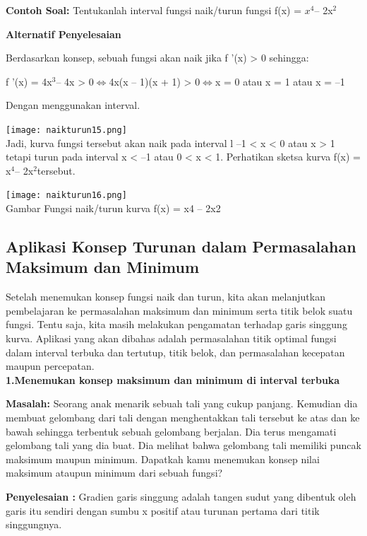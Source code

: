 \documentclass[11pt,fleqn]{book} %
\begin{document}
\textbf {Contoh Soal:} 
Tentukanlah interval fungsi naik/turun fungsi f(x) = $x^{4} $– 2x$^{2}$

\textbf{Alternatif Penyelesaian}

Berdasarkan konsep, sebuah fungsi akan naik jika f '(x) > 0 sehingga:

f '(x) = 4x$^{3} $– 4x > 0$ \Leftrightarrow $4x(x – 1)(x + 1) > 0$ \Leftrightarrow $x = 0 atau x = 1 atau x = –1

Dengan menggunakan interval.

\texttt{[image: naikturun15.png]}\\

Jadi, kurva fungsi tersebut akan naik pada interval l –1 < x < 0 atau x > 1 tetapi turun pada interval x < –1 atau 0 < x < 1. Perhatikan sketsa kurva f(x) = x$^{4} $– 2x$^{2} $tersebut.\\

\begin{center}
\texttt{[image: naikturun16.png]}\\
Gambar Fungsi naik/turun kurva f(x) = x4 – 2x2
\end{center}

\subsection{Aplikasi Konsep Turunan dalam
Permasalahan Maksimum dan Minimum}

Setelah menemukan konsep fungsi naik dan turun,
kita akan melanjutkan pembelajaran ke permasalahan
maksimum dan minimum serta titik belok suatu fungsi.
Tentu saja, kita masih melakukan pengamatan terhadap
garis singgung kurva. Aplikasi yang akan dibahas adalah permasalahan titik optimal fungsi dalam interval terbuka dan tertutup, titik belok, dan permasalahan kecepatan maupun percepatan.\\

\textbf{1.Menemukan konsep maksimum dan minimum di interval terbuka}

\textbf{Masalah: }
Seorang anak menarik sebuah tali yang cukup
panjang. Kemudian dia membuat gelombang dari
tali dengan menghentakkan tali tersebut ke atas dan
ke bawah sehingga terbentuk sebuah gelombang
berjalan. Dia terus mengamati gelombang tali yang
dia buat. Dia melihat bahwa gelombang tali memiliki
puncak maksimum maupun minimum. Dapatkah
kamu menemukan konsep nilai maksimum ataupun
minimum dari sebuah fungsi?

\textbf{Penyelesaian :}
Gradien garis singgung adalah tangen sudut yang
dibentuk oleh garis itu sendiri dengan sumbu x positif atau turunan pertama dari titik singgungnya.
\end{document}
